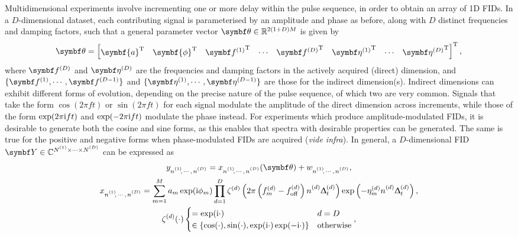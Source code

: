 Multidimensional experiments involve incrementing one or more delay within the
pulse sequence, in order to obtain an array of \ac{1D} \acp{FID}. In a
$D$-dimensional dataset, each contributing signal is parameterised by an
amplitude and phase as before, along with $D$ distinct frequencies and damping
factors, such that a general parameter vector  $\bth \in \mathbb{R}^{2(1+D)M}$
is given by
\begin{equation}
    \bth =
    \begin{bmatrix}
    \symbf{a}\T &
    \symbf{\phi}\T &
    {\bdfone}\T &
    \cdots &
    {\bdfD}\T &
    {\bdetaone}\T &
    \cdots &
    {\bdetaD}\T
    \end{bmatrix}\T,
    \label{eq:theta}
\end{equation}
where $\bdfD$ and $\bdetaD$ are the frequencies and damping factors in the
actively acquired (direct) dimension, and $\lbrace \bdfone, \cdots,
\bdfDminusone \rbrace$ and
$\lbrace \bdetaone, \cdots, \bdetaDminusone \rbrace$ are those for the indirect
dimension(s).
Indirect dimensions can exhibit different forms of evolution, depending on
the precise nature of the pulse sequence, of which two are very
common\cite[Section 4.3.4]{Cavanagh2007}. Signals that take the form $\cos(2
\pi f t)$ or $\sin(2 \pi f t)$ for each signal modulate the amplitude of the
direct dimension across increments, while those of the form $\exp(2 \pi \mathrm{i} f
t)$ and $\exp(-2 \pi \mathrm{i} f t)$ modulate the phase instead.
For experiments which produce amplitude-modulated \acp{FID}, it is desirable to
generate both the cosine and sine forms, as this enables that spectra with
desirable properties can be generated. The same is true for the positive
and negative forms when phase-modulated \acp{FID} are acquired (\emph{vide
infra}). In general, a $D$-dimensional \ac{FID} $\bY \in \mathbb{C}^{\None
\times \cdots \times \ND}$ can be expressed as
\begin{subequations}
    \begin{gather}
        \ynonenD = \xnonenD(\bth) + \wnonenD,\\
        \xnonenD
            = \sumM \amexpphim \prodD
            \zeta^{(d)}\left(2 \pi \left(f^{(d)}_m  - \foffd\right) \nd \Dtd\right)
            \exp\left(-\eta^{(d)}_m \nd \Dtd\right),\\
        \zeta^{(d)}(\cdot)
        \begin{cases}
            = \exp(\iu\cdot) & d = D \\
            \in \left\lbrace \cos(\cdot), \sin(\cdot), \exp(\iu\cdot) \exp(-\iu\cdot)\right\rbrace & \text{otherwise}
        \end{cases},
    \end{gather}
    \label{eq:general-fid}%
\end{subequations}%

